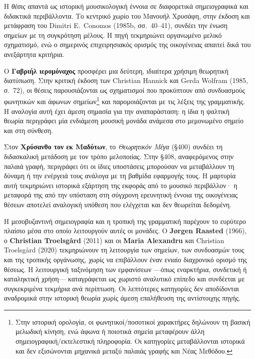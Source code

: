 \documentclass[11pt,a4paper]{article}
\begin{document}
Η \emph{θέσις} απαντά ως ιστορική μουσικολογική έννοια σε διαφορετικά σημειογραφικά και διδακτικά περιβάλλοντα. Το κεντρικό χωρίο του Μανουήλ Χρυσάφη, στην έκδοση και μετάφραση του Dimitri E.~Conomos (1985b, σσ.~40--41), συνδέει την ένωση σημείων με τη συγκρότηση μέλους. Η πηγή τεκμηριώνει οργανωμένο μελικό σχηματισμό, ενώ ο σημερινός επιχειρησιακός ορισμός της οικογένειας απαιτεί δικά του ανεξάρτητα κριτήρια.

Ο \textbf{Γαβριήλ ιερομόναχος} προσφέρει μια δεύτερη, ιδιαίτερα χρήσιμη θεωρητική διατύπωση. Στην κριτική έκδοση των Christian Hannick και Gerda Wolfram (1985, σ.~72), οι θέσεις παρουσιάζονται ως σχηματισμοί που προκύπτουν από συνδυασμούς φωνητικών και άφωνων σημείων\footnote{Στην ιστορική ορολογία, οι φωνητικοί/ποσοτικοί χαρακτήρες δηλώνουν τη βασική μελωδική κίνηση, ενώ άφωνα ή ποιοτικά σημεία μεταφέρουν άλλη σημειογραφική/εκτελεστική πληροφορία. Οι κατηγορίες μεταβάλλονται ιστορικά και δεν εξισώνονται μηχανικά μεταξύ παλαιάς γραφής και Νέας Μεθόδου.} και παρομοιάζονται με τις λέξεις της γραμματικής. Η αναλογία αυτή έχει άμεση σημασία για την αναπαράσταση: η ίδια η ψαλτική θεωρία περιγράφει μία ενδιάμεση μουσική μονάδα ανάμεσα στο μεμονωμένο σημείο και στη σύνθεση.

Στον \textbf{Χρύσανθο τον εκ Μαδύτων}, το \emph{Θεωρητικόν Μέγα} (§400) συνδέει τη διδασκαλική μετάδοση με τον τρόπο μελοποιίας. Στην §408, αναφερόμενος στην παλαιά γραφή, περιγράφει ότι οι ίδιες υποστάσεις μπορούσαν να μεταβάλλουν τη δύναμη ή την ενέργειά τους ανάλογα με τη βαθμίδα εφαρμογής τους. Η μαρτυρία αυτή τεκμηριώνει ιστορικά εξάρτηση της εκφοράς από το μουσικό περιβάλλον· η μεταφορά της από την υπόσταση στη σύγχρονη ερευνητική έννοια της οικογένειας θέσεων αποτελεί αναλογική υπόθεση που ελέγχεται και δεν θεωρείται δεδομένη.

Η μεσοβυζαντινή σημειογραφία και η τροπική της γραμματική παρέχουν το ευρύτερο πλαίσιο μέσα στο οποίο λειτουργούν αυτές οι μονάδες. Ο \textbf{Jørgen Raasted} (1966), ο \textbf{Christian Troelsgård} (2011) και οι \textbf{Maria Alexandru} και Christian Troelsgård (2020) τεκμηριώνουν τη λειτουργία των σημείων, των συνδυασμών τους και της τροπικής οργάνωσης, χωρίς να επιβάλλουν έναν ενιαίο διαχρονικό ορισμό της θέσεως. Η λειτουργική ταξινόμηση των εμφανίσεων ---όπως εναρκτήρια, συνδετική ή καταληκτική χρήση--- καταγράφεται ως χωριστό αναλυτικό επίπεδο και συνδέεται με συγκεκριμένα τεκμήρια ανά περίπτωση. Οι λεπτότερες κατηγορίες δεν αποδίδονται αναδρομικά στην ιστορική θεωρία χωρίς άμεση επαλήθευση της αντίστοιχης πηγής.
\end{document}
